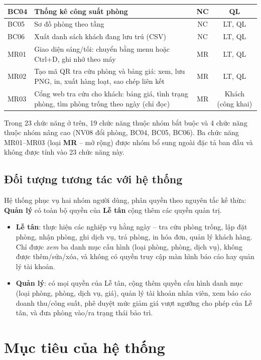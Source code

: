\documentclass[14pt]{report}
\begin{document}
\begin{longtable}{|l|p{6.8cm}|c|c|}
BC04 & Thống kê công suất phòng & NC & QL \\\hline
BC05 & Sơ đồ phòng theo tầng & NC & LT, QL \\\hline
BC06 & Xuất danh sách khách đang lưu trú (CSV) & NC & LT, QL \\\hline
MR01 & Giao diện sáng/tối: chuyển bằng menu hoặc Ctrl+D, ghi nhớ theo máy & MR & LT, QL \\\hline
MR02 & Tạo mã QR tra cứu phòng và bảng giá: xem, lưu PNG, in, xuất hàng loạt, sao chép liên kết & MR & LT, QL \\\hline
MR03 & Cổng web tra cứu cho khách: bảng giá, tình trạng phòng, tìm phòng trống theo ngày (chỉ đọc) & MR & Khách (công khai) \\\hline
\end{longtable}

Trong 23 chức năng ở trên, 19 chức năng thuộc nhóm bắt buộc và 4 chức năng thuộc nhóm nâng cao (NV08 đổi phòng, BC04, BC05, BC06). Ba chức năng MR01--MR03 (loại \textbf{MR} -- mở rộng) được nhóm bổ sung ngoài đặc tả ban đầu và không được tính vào 23 chức năng này.

\subsection{Đối tượng tương tác với hệ thống}

Hệ thống phục vụ hai nhóm người dùng, phân quyền theo nguyên tắc kế thừa: \textbf{Quản lý} có toàn bộ quyền của \textbf{Lễ tân} cộng thêm các quyền quản trị.

\begin{itemize}
  \item \textbf{Lễ tân}: thực hiện các nghiệp vụ hằng ngày -- tra cứu phòng trống, lập đặt phòng, nhận phòng, ghi dịch vụ, trả phòng, in hóa đơn, quản lý khách hàng. Chỉ được \emph{xem} ba danh mục cấu hình (loại phòng, phòng, dịch vụ), không được thêm/sửa/xóa, và không có quyền truy cập màn hình báo cáo hay quản lý tài khoản.
  \item \textbf{Quản lý}: có mọi quyền của Lễ tân, cộng thêm quyền cấu hình danh mục (loại phòng, phòng, dịch vụ, giá), quản lý tài khoản nhân viên, xem báo cáo doanh thu/công suất, phê duyệt mức giảm giá vượt ngưỡng cho phép của Lễ tân, và đưa phòng vào/ra trạng thái bảo trì.
\end{itemize}

\section{Mục tiêu của hệ thống}
\end{document}
